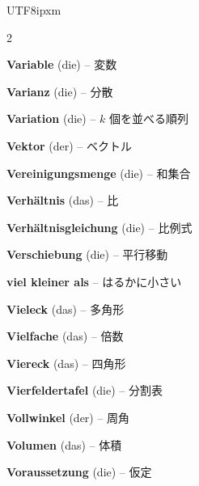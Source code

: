 \begin{CJK}{UTF8}{ipxm}
\begin{multicols}{2}
\par\nopagebreak
\textbf{Variable} (die) -- 変数\dotfill\hyperref[e:71]{\pageref*{e:71}}\par
\textbf{Varianz} (die) -- 分散\dotfill\hyperref[e:336]{\pageref*{e:336}}\par
\textbf{Variation} (die) -- $k$ 個を並べる順列\dotfill\hyperref[e:342]{\pageref*{e:342}}\par
\textbf{Vektor} (der) -- ベクトル\dotfill\hyperref[e:301]{\pageref*{e:301}}\par
\textbf{Vereinigungsmenge} (die) -- 和集合\dotfill\hyperref[e:101]{\pageref*{e:101}}\par
\textbf{Verhältnis} (das) -- 比\dotfill\hyperref[e:40]{\pageref*{e:40}}\par
\textbf{Verhältnisgleichung} (die) -- 比例式\dotfill\hyperref[e:41]{\pageref*{e:41}}\par
\textbf{Verschiebung} (die) -- 平行移動\dotfill\hyperref[e:173]{\pageref*{e:173}}\par
\textbf{viel kleiner als} -- はるかに小さい\dotfill\hyperref[e:67]{\pageref*{e:67}}\par
\textbf{Vieleck} (das) -- 多角形\dotfill\hyperref[e:204]{\pageref*{e:204}}\par
\textbf{Vielfache} (das) -- 倍数\dotfill\hyperref[e:55]{\pageref*{e:55}}\par
\textbf{Viereck} (das) -- 四角形\dotfill\hyperref[e:196]{\pageref*{e:196}}\par
\textbf{Vierfeldertafel} (die) -- 分割表\dotfill\hyperref[e:333]{\pageref*{e:333}}\par
\textbf{Vollwinkel} (der) -- 周角\dotfill\hyperref[e:162]{\pageref*{e:162}}\par
\textbf{Volumen} (das) -- 体積\dotfill\hyperref[e:255]{\pageref*{e:255}}\par
\textbf{Voraussetzung} (die) -- 仮定\dotfill\hyperref[e:348]{\pageref*{e:348}}\par


\end{multicols}
\end{CJK}
